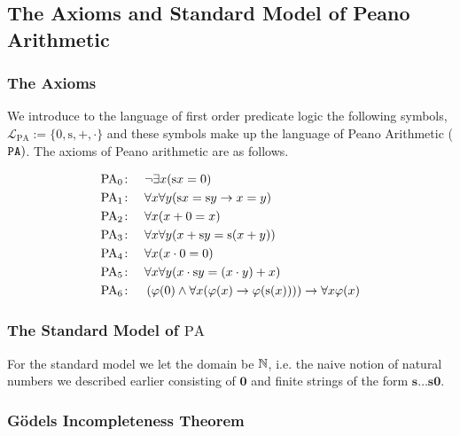 \subsection{The Axioms and Standard Model of Peano Arithmetic}

\subsubsection{The Axioms}
We introduce to the language of first order predicate logic the following symbols, $\mathcal{L}_{\mathrm{PA}}:=\{0,\mathrm{s},+,\cdot\}$ and these symbols make up the language of Peano Arithmetic ($\verb|PA|)$. The axioms of Peano arithmetic are as follows. 
    \begin{axioms}
        \begin{align*}
            \mathrm{PA}_0\colon\quad & \neg \exists x (\mathrm{s} x = 0) \\
            \mathrm{PA}_1\colon\quad & \forall x \forall y (\mathrm{s} x = \mathrm{s} y \rightarrow x = y) \\
            \mathrm{PA}_2\colon\quad & \forall x (x + 0 = x) \\
            \mathrm{PA}_3\colon\quad & \forall x \forall y (x + \mathrm{s} y = \mathrm{s}(x + y)) \\
            \mathrm{PA}_4\colon\quad & \forall x (x \cdot 0 = 0) \\
            \mathrm{PA}_5\colon\quad & \forall x \forall y (x \cdot \mathrm{s} y = (x \cdot y) + x) \\
            \mathrm{PA}_6\colon\quad & \left( \varphi(0) \land \forall x (\varphi(x) \rightarrow \varphi(\mathrm{s} (x))) \right) \rightarrow \forall x \varphi(x)
        \end{align*}
    \end{axioms}
\subsubsection{The Standard Model of $\mathrm{PA}$}
For the standard model we let the domain be $\mathbb{N}$, i.e. the naive notion of natural numbers we described earlier consisting of $\mathbf{0}$ and finite strings of the form $\mathbf{s}\dots \mathbf{s}\mathbf{0}$. 
\subsubsection{Gödels Incompleteness Theorem}

